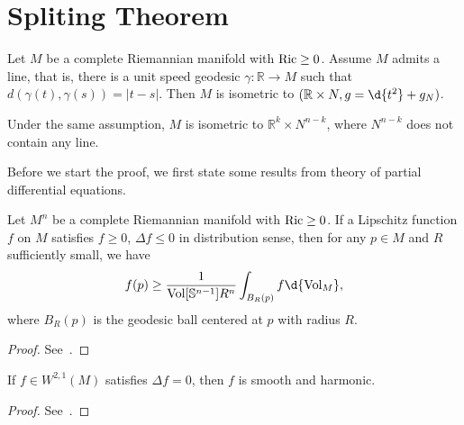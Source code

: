 \section{Spliting Theorem}

\begin{thm}\label{Cheeger Gromoll}
    Let $M$ be a complete Riemannian manifold with $\operatorname{Ric}\geq 0$.
    Assume $M$ admits a line, that is, there is a unit speed geodesic $\gamma:\mathbb{R}\to M$ such that $d(\gamma(t),\gamma(s))=|t-s|$.
    Then $M$ is isometric to $(\mathbb{R}\times N,g=\d{t^2}+g_N)$.
\end{thm}

\begin{cor}
    Under the same assumption, $M$ is isometric to $\mathbb{R}^k\times N^{n-k}$, where $N^{n-k}$ does not contain any line.
\end{cor}

Before we start the proof, we first state some results from theory of partial differential equations.
\begin{thm}
    Let $M^n$ be a complete Riemannian manifold with $\operatorname{Ric}\geq 0$.
    If a Lipschitz function $f$ on $M$ satisfies $f\geq 0$, $\Delta f\leq 0$ in distribution sense, then for any $p\in M$ and $R$ sufficiently small, we have
    \[f(p)\geq\frac{1}{\Vol[\mathbb{S}^{n-1}]R^n}\int_{B_R(p)}f\d{\Vol_M},\]
    where $B_R(p)$ is the geodesic ball centered at $p$ with radius $R$.
\end{thm}
\begin{proof}
    See~\cite[Chapter~1.~Proposition~2.1]{Shoen-Yau}.
\end{proof}

\begin{thm}
    If $f\in W^{2,1}(M)$ satisfies $\Delta f=0$, then $f$ is smooth and harmonic.
\end{thm}
\begin{proof}
    See~\cite[Lemma~2]{Weyl}.
\end{proof}

